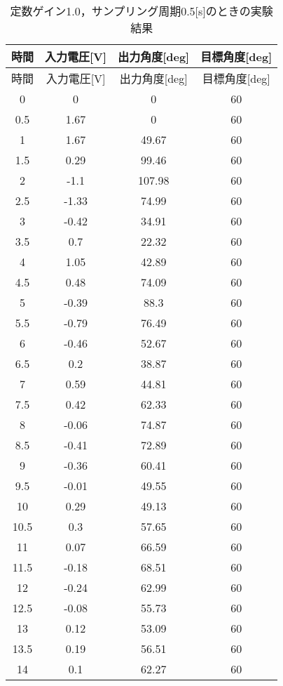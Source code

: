 \begin{longtable}[c]{|c|c|c|c|}
  \caption{定数ゲイン1.0，サンプリング周期0.5[s]のときの実験結果}
  \label{tab4} \\
  \hline
   時間& 	入力電圧[V]&	出力角度[deg]&	目標角度[deg] \\ \hline \hline \endfirsthead 
\hline \endhead
\hline \endfoot
\hline \endlastfoot
時間& 	入力電圧[V]&    出力角度[deg]&	目標角度[deg] \\ \hline
0   & 	0    & 	0      &60 \\ \hline 
0.5 &	1.67 &	0      &60 \\ \hline 
1   &	1.67 &	49.67  &60 \\ \hline 
1.5 &	0.29 &	99.46  &60 \\ \hline 
2   &	-1.1 &	107.98 &60 \\ \hline 
2.5 &	-1.33&	74.99  &60 \\ \hline 
3   &	-0.42&	34.91  &60 \\ \hline 
3.5 &	0.7  &	22.32  &60 \\ \hline 
4   &	1.05 &	42.89  &60 \\ \hline 
4.5 &	0.48 &	74.09  &60 \\ \hline 
5   &	-0.39&	88.3   &60 \\ \hline 
5.5 &	-0.79&	76.49  &60 \\ \hline 
6   &	-0.46&	52.67  &60 \\ \hline 
6.5 &	0.2  &	38.87  &60 \\ \hline 
7   &	0.59 &	44.81  &60 \\ \hline 
7.5 &	0.42 &	62.33  &60 \\ \hline 
8   &	-0.06&	74.87  &60 \\ \hline 
8.5 &	-0.41&	72.89  &60 \\ \hline 
9   &	-0.36&	60.41  &60 \\ \hline 
9.5 &	-0.01&	49.55  &60 \\ \hline 
10  &	0.29 &	49.13  &60 \\ \hline 
10.5&	0.3  &	57.65  &60 \\ \hline 
11  &	0.07 &	66.59  &60 \\ \hline 
11.5&	-0.18&	68.51  &60 \\ \hline 
12  &	-0.24&	62.99  &60 \\ \hline 
12.5&	-0.08&	55.73  &60 \\ \hline 
13  &	0.12 &	53.09  &60 \\ \hline 
13.5&	0.19 &	56.51  &60 \\ \hline 
14  &	0.1  &	62.27  &60 \\ \hline 

\end{longtable}
